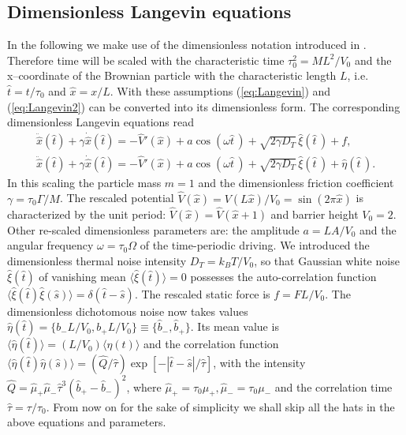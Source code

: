 \documentclass[12pt]{iopart}
\begin{document}
\subsection{Dimensionless Langevin equations}
In the following we make use of the dimensionless notation introduced in \cite{MacKos2004}. Therefore time will be scaled with the characteristic time $\tau_0^2 = M L^2 / V_0$ and the x--coordinate of the Brownian particle with the characteristic length $L$, i.e. $\hat{t} = t/\tau_0$ and $\hat{x} = x/L$. With these assumptions (\ref{eq:Langevin}) and (\ref{eq:Langevin2}) can be converted into its dimensionless form. The corresponding dimensionless Langevin equations read
\begin{eqnarray}
\ddot{\hat{x}}(\hat{t}) + \gamma \dot{\hat{x}}(\hat{t}) =-  \hat{V}'(\hat{x}) + a \cos (\omega \hat{t}\, ) + \sqrt{2\gamma D_T} \, {\hat\xi}({\hat t}\,) + f, \label{eq:dLangevin1}\\
\ddot{\hat{x}}(\hat{t}) + \gamma \dot{\hat{x}}(\hat{t}) =-  \hat{V}'(\hat{x}) +  a \cos (\omega \hat{t}\, ) + \sqrt{2\gamma D_T} \,{\hat\xi}({\hat t}\,) + \hat{\eta}({\hat t}\,). \label{eq:dLangevin2}
\end{eqnarray}
In this scaling the particle mass $m =1$  and the dimensionless  
friction coefficient \mbox{$\gamma = \tau_0 \Gamma / M$}. The rescaled potential $\hat{V}(\hat{x}) = V(L\hat{x})/V_0 = \sin(2\pi \hat{x})$ is characterized by the unit period:  $\hat{V}(\hat{x}) = \hat{V}(\hat{x} +1)$ and barrier height $V_0 = 2$. Other re-scaled dimensionless parameters are: the amplitude $a = LA/V_0$ and the angular frequency $\omega = \tau_0 \Omega$ of the time-periodic driving. We introduced the dimensionless thermal noise intensity \mbox{$D_T = k_BT/V_0$}, so that  Gaussian white noise $\hat{\xi}(\hat{t})$ of vanishing mean $\langle\hat{\xi}(\hat{t})\rangle =0$ possesses the auto-correlation function $\langle \hat{\xi}(\hat{t})\hat{\xi}(\hat{s}) \rangle = \delta(\hat{t} - \hat{s})$. The rescaled static force is $f = F L / V_0$. The dimensionless dichotomous noise now takes values $\hat{\eta}(\hat{t}) = \{b_- L / V_0, b_+ L / V_0\} \equiv \{ \hat{b}_-, \hat{b}_+\}$. Its mean value is $\langle \hat{\eta} (\hat{t}) \rangle = (L/V_0) \langle \eta(t) \rangle$ and the correlation function $\langle \hat{\eta}(\hat{t}) \hat{\eta}(\hat{s}) \rangle = (\hat{Q} / \hat{\tau}) \exp[-|\hat{t} - \hat{s}|/\hat{\tau}]$, with the intensity $\hat{Q} = \hat{\mu}_+ \hat{\mu}_- \hat{\tau}^3 (\hat{b}_+ - \hat{b}_-)^2 $, where $\hat{\mu}_+ =\tau_0 \mu_+, \hat{\mu}_- =\tau_0 \mu_-$ and the correlation time $\hat{\tau} = \tau / \tau_0$. From now on for the sake of simplicity we shall skip all the hats in the above equations and parameters.
\end{document}
